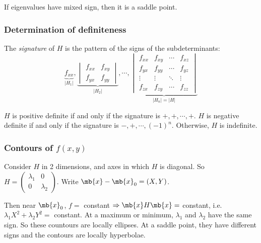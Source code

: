 \documentclass[a4paper]{article}
\begin{document}
If eigenvalues have mixed sign, then it is a saddle point.

\subsubsection{Determination of definiteness}
\begin{defi}
  The \emph{signature} of $H$ is the pattern of the signs of the subdeterminants:
  \[
  \underbrace{f_{xx}}_{|H_1|}, 
  \underbrace{
  \begin{vmatrix}
    f_{xx} & f_{xy}\\
    f_{yx} & f_{yy}
  \end{vmatrix}}_{|H_2|},\cdots, 
  \underbrace{\begin{vmatrix}
    f_{xx} & f_{xy} & \cdots & f_{xz}\\
    f_{yx} & f_{yy} & \cdots & f_{yz}\\
    \vdots & \vdots & \ddots & \vdots\\
    f_{zx} & f_{zy} & \cdots & f_{zz}
  \end{vmatrix}}_{|H_n| = |H|}
  \]
\end{defi}

\begin{prop}
  $H$ is positive definite if and only if the signature is $+, +, \cdots, +$. $H$ is negative definite if and only if the signature is $-, +, \cdots, (-1)^n$. Otherwise, $H$ is indefinite.
\end{prop}

\subsubsection{Contours of \texorpdfstring{$f(x, y)$}{f(x, y)}}
Consider $H$ in 2 dimensions, and axes in which $H$ is diagonal. So $H = 
\begin{pmatrix}
  \lambda_1 & 0\\
  0 & \lambda_2
\end{pmatrix}$. Write $\mb{x} - \mb{x}_0 = (X, Y)$.

Then near $\mb{x}_0$, $f = $ constant $\Rightarrow \mb{x}H\mb{x} = $ constant, i.e. $\lambda_1 X^2 + \lambda_2 Y^2 = $ constant. At a maximum or minimum, $\lambda_1$ and $\lambda_2$ have the same sign. So these countours are locally ellipses. At a saddle point, they have different signs and the contours are locally hyperbolae.
\end{document}
